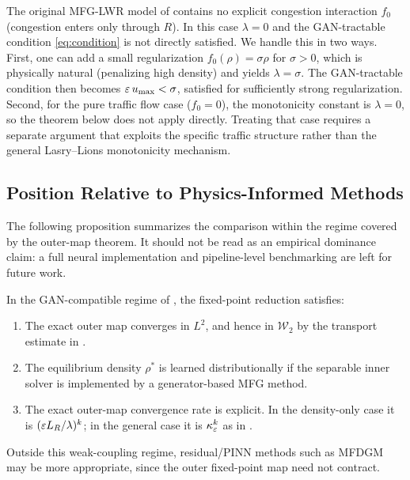\begin{remark}
\label{rem:f0_traffic}
The original MFG-LWR model of \citet{huang2019mfg} contains no explicit
congestion interaction $f_0$ (congestion enters only through $R$).
In this case $\lambda = 0$ and the GAN-tractable condition \eqref{eq:condition}
is not directly satisfied.
We handle this in two ways.
First, one can add a small regularization $f_0(\rho) = \sigma\rho$ for
$\sigma > 0$, which is physically natural (penalizing high density)
and yields $\lambda = \sigma$.
The GAN-tractable condition then becomes $\varepsilon\, u_{\max} < \sigma$,
satisfied for sufficiently strong regularization.
Second, for the pure traffic flow case ($f_0 = 0$), the monotonicity constant
is $\lambda=0$, so the theorem below does not apply directly.  Treating that
case requires a separate argument that exploits the specific traffic
structure rather than the general Lasry--Lions monotonicity mechanism.
\end{remark}

\subsection{Position Relative to Physics-Informed Methods}

The following proposition summarizes the comparison within the regime covered
by the outer-map theorem.  It should not be read as an empirical dominance
claim: a full neural implementation and pipeline-level benchmarking are left
for future work.

\begin{proposition}
\label{prop:gap}
In the GAN-compatible regime of , the fixed-point
reduction satisfies:
\begin{enumerate}
  \item The exact outer map converges in $L^2$, and hence in $\mathcal{W}_2$
    by the transport estimate in .
  \item The equilibrium density $\rho^*$ is learned distributionally
    if the separable inner solver is implemented by a generator-based MFG
    method.
  \item The exact outer-map convergence rate is explicit.  In the density-only
    case it is $(\varepsilon L_R/\lambda)^k$; in the general case it is
    $\kappa_\varepsilon^k$ as in .
\end{enumerate}
Outside this weak-coupling regime, residual/PINN methods such as MFDGM may be
more appropriate, since the outer fixed-point map need not contract.
\end{proposition}

